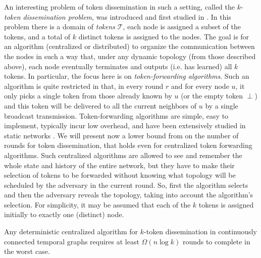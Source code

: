 \documentclass[oribibl, 11pt]{llncs}
\newcommand{\calt}{\mathcal{T}}
\begin{document}
An interesting problem of token dissemination in such a setting, called the $k$-\emph{token dissemination problem}, was introduced and first studied in \cite{KLO10}. In this problem there is a domain of \emph{tokens} $\calt$, each node is assigned a subset of the tokens, and a total of $k$ distinct tokens is assigned to the nodes. The goal is for an algorithm (centralized or distributed) to organize the communication between the nodes in such a way that, under any dynamic topology (from those described above), each node eventually terminates and outputs (i.e. has learned) all $k$ tokens. In particular, the focus here is on \emph{token-forwarding algorithms}. Such an algorithm is quite restricted in that, in every round $r$ and for every node $u$, it only picks a single token from those already known by $u$ (or the empty token $\perp$) and this token will be delivered to all the current neighbors of $u$ by a single broadcast transmission. Token-forwarding algorithms are simple, easy to implement, typically incur low overhead, and have been extensively studied in static networks \cite{Le92,Pe00}. We will present now a lower bound from \cite{KLO10} on the number of rounds for token dissemination, that holds even for centralized token forwarding algorithms. Such centralized algorithms are allowed to see and remember the whole state and history of the entire network, but they have to make their selection of tokens to be forwarded without knowing what topology will be scheduled by the adversary in the current round. So, first the algorithm selects and then the adversary reveals the topology, taking into account the algorithm's selection. For simplicity, it may be assumed that each of the $k$ tokens is assigned initially to exactly one (distinct) node.  

\begin{theorem}  \label{the:klo10-lower-bound}
Any deterministic centralized algorithm for $k$-token dissemination in continuously connected temporal graphs requires at least $\Omega(n\log k)$ rounds to complete in the worst case.
\end{theorem}
\end{document}
